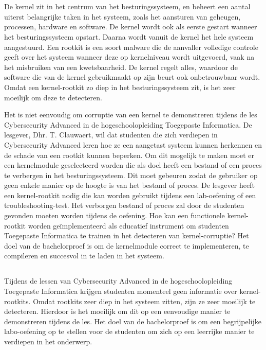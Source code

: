 
\chapter{}%
\label{ch:inleiding}

De kernel zit in het centrum van het besturingssysteem, en beheert een aantal uiterst belangrijke taken in het systeem, zoals het aansturen van geheugen, processen, hardware en software. De kernel wordt ook als eerste gestart wanneer het besturingssysteem opstart. Daarna wordt vanuit de kernel het hele systeem aangestuurd. Een rootkit is een soort malware die de aanvaller volledige controle geeft over het systeem wanneer deze op kernelniveau wordt uitgevoerd, vaak na het misbruiken van een kwetsbaarheid. De kernel regelt alles, waardoor de software die van de kernel gebruikmaakt op zijn beurt ook onbetrouwbaar wordt. Omdat een kernel-rootkit zo diep in het besturingssysteem zit, is het zeer moeilijk om deze te detecteren. 

Het is niet eenvoudig om corruptie van een kernel te demonstreren tijdens de les Cybersecurity Advanced in de hogeschoolopleiding Toegepaste Informatica. De lesgever, Dhr. T. Clauwaert, wil dat studenten die zich verdiepen in Cybersecurity Advanced leren hoe ze een aangetast systeem kunnen herkennen en de schade van een rootkit kunnen beperken. Om dit mogelijk te maken moet er een kernelmodule geselecteerd worden die als doel heeft een bestand of een proces te verbergen in het besturingssysteem. Dit moet gebeuren zodat de gebruiker op geen enkele manier op de hoogte is van het bestand of proces. De lesgever heeft een kernel-rootkit nodig die kan worden gebruikt tijdens een lab-oefening of een troubleshooting-test. Het verborgen bestand of proces zal door de studenten gevonden moeten worden tijdens de oefening. Hoe kan een functionele kernel-rootkit worden geïmplementeerd als educatief instrument om studenten Toegepaste Informatica te trainen in het detecteren van kernel-corruptie? Het doel van de bachelorproef is om de kernelmodule correct te implementeren, te compileren en succesvol in te laden in het systeem.

\section{}%
\label{sec:probleemstelling}
Tijdens de lessen van Cybersecurity Advanced in de hogeschoolopleiding Toegepaste Informatica krijgen studenten momenteel geen informatie over kernel-rootkits. Omdat rootkits zeer diep in het systeem zitten, zijn ze zeer moeilijk te detecteren. Hierdoor is het moeilijk om dit op een eenvoudige manier te demonstreren tijdens de les. Het doel van de bachelorproef is om een begrijpelijke labo-oefening op te stellen voor de studenten om zich op een leerrijke manier te verdiepen in het onderwerp.

